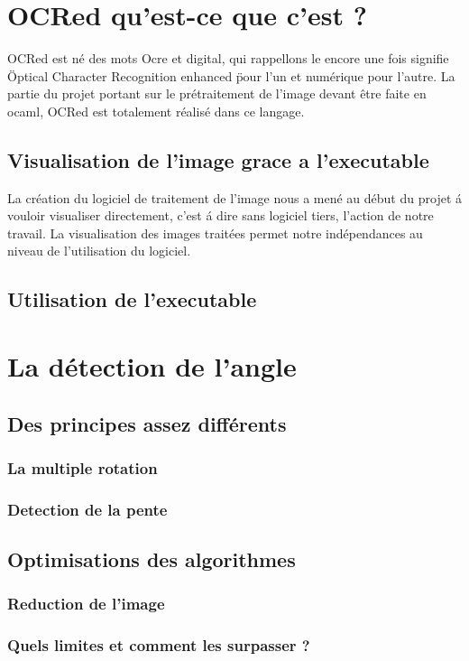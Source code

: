 \chapter{ OCRed qu'est-ce que c'est ? }
 OCRed est n\'e des mots Ocre et digital, qui rappellons le encore une fois
 signifie \" Optical Character Recognition enhanced \" pour l'un et
 num\'erique pour l'autre. La partie du projet portant sur le
 pr\'etraitement de l'image devant \^etre faite en ocaml, OCRed est
 totalement r\'ealis\'e dans ce langage.
\section{ Visualisation de l'image grace a l'executable }
 La cr\'eation du logiciel de traitement de l'image nous a men\'e au
 d\'ebut du projet \'a vouloir visualiser directement, c'est \'a dire
 sans logiciel tiers, l'action de notre travail.
 La visualisation des images trait\'ees permet notre ind\'ependances
 au niveau de l'utilisation du logiciel.
\section{ Utilisation de l'executable }
\chapter{ La d\'etection de l'angle }
\section{ Des principes assez diff\'erents}
\subsection{ La multiple rotation }
\subsection{ Detection de la pente }
\section{ Optimisations des algorithmes }
\subsection{ Reduction de l'image }
\subsection{ Quels limites et comment les surpasser ? }

